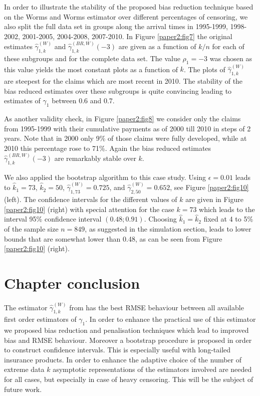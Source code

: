 \vspace{0.3cm}
In order to illustrate the stability of the proposed bias reduction technique based on the Worms and Worms estimator over different percentages of censoring, we also split the full data set in groups along the arrival times in 1995-1999, 1998-2002, 2001-2005, 2004-2008, 2007-2010. In Figure \ref{paper2:fig7} the original estimates $\hat{\gamma}_{1,k}^{(W)}$ and $\hat{\gamma}_{1,k}^{(BR,W)}(-3)$ are given as a function of $k/n$ for each of these subgroups and for the complete data set. The value $\rho_1=-3$ was chosen as this value yields the most constant plots as a function of $k$. The plots of $\hat{\gamma}_{1,k}^{(W)}$ are steepest for the claims which are most recent in 2010. The stability of the bias reduced estimates over these subgroups is quite convincing leading to estimates of $\gamma_1$ between 0.6 and 0.7.

\vspace{0.3cm}
As another validity check, in Figure \ref{paper2:fig8} we consider only the claims from 1995-1999 with their cumulative payments as of 2000 till 2010 in steps of 2 years. Note that in 2000 only 9\% of those claims were fully developed, while at 2010 this percentage rose to 71\%. Again the bias reduced estimates 
$\hat{\gamma}_{1,k}^{(BR,W)}(-3)$ are remarkably stable over $k$. 

\vspace{0.3cm}
We also applied the bootstrap algorithm to this case study. 
Using $\epsilon = 0.01$ leads to $\hat{k}_1=73$, $\hat{k}_2=50$, $\hat{\gamma}_{1,73}^{(W)}=0.725$, and $\hat{\gamma}_{2,50}^{(W)}=0.652$, see Figure \ref{paper2:fig10} (left). The confidence intervals for the different values of $k$ are given in Figure \ref{paper2:fig10} (right) with special attention for the case $k=73$ which leads to the interval 95\% confidence interval $(0.48;0.91)$.
Choosing $\hat{k}_1=\hat{k}_2$ fixed at 4 to 5\% of the sample size $n=849$, as suggested in the simulation section, leads to lower bounds that are somewhat lower than 0.48, as can be seen from Figure \ref{paper2:fig10} (right).

 
\section{Chapter conclusion} 
\label{Sec6}

The estimator $\hat{\gamma}_{1,k}^{(W)}$ from \cite{worms2014new} has the best RMSE behaviour between all available first order estimators of $\gamma_1$. In order to enhance the practical use of this estimator we proposed bias reduction and penalisation techniques which lead to improved bias and RMSE behaviour. Moreover a bootstrap procedure is proposed in order to construct confidence intervals. This is especially useful with long-tailed insurance products. In order to enhance the adaptive choice of the number of extreme data $k$ 	asymptotic representations of the estimators involved are needed for all cases, but especially in case of heavy censoring. This will be the subject of future work. 

